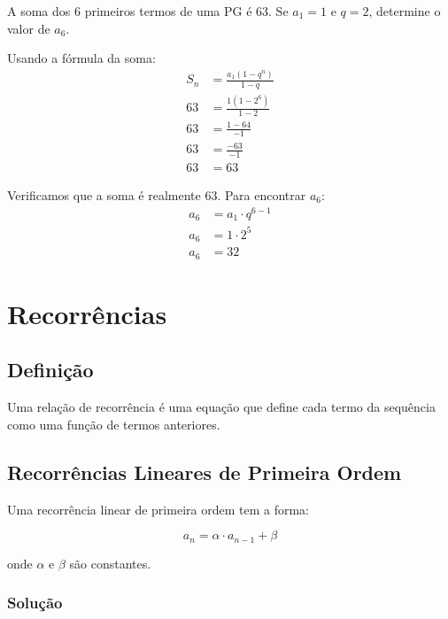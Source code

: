 \documentclass[12pt,a4paper]{article}
\begin{document}
\begin{tcolorbox}[colback=blue!5!white,colframe=blue!75!black,title=Exemplo 2]
A soma dos 6 primeiros termos de uma PG é 63. Se $a_1 = 1$ e $q = 2$, determine o valor de $a_6$.
\end{tcolorbox}

\begin{tcolorbox}[colback=green!5!white,colframe=green!75!black,title=Resolução]
Usando a fórmula da soma:
\begin{align}
S_n &= \frac{a_1(1-q^n)}{1-q}\\
63 &= \frac{1(1-2^6)}{1-2}\\
63 &= \frac{1-64}{-1}\\
63 &= \frac{-63}{-1}\\
63 &= 63
\end{align}

Verificamos que a soma é realmente 63. Para encontrar $a_6$:
\begin{align}
a_6 &= a_1 \cdot q^{6-1}\\
a_6 &= 1 \cdot 2^5\\
a_6 &= 32
\end{align}
\end{tcolorbox}
\section{Recorrências}

\subsection{Definição}

Uma relação de recorrência é uma equação que define cada termo da sequência como uma função de termos anteriores.

\subsection{Recorrências Lineares de Primeira Ordem}

Uma recorrência linear de primeira ordem tem a forma:

\begin{equation}
a_n = \alpha \cdot a_{n-1} + \beta
\end{equation}

onde $\alpha$ e $\beta$ são constantes.

\subsubsection{Solução}
\end{document}
